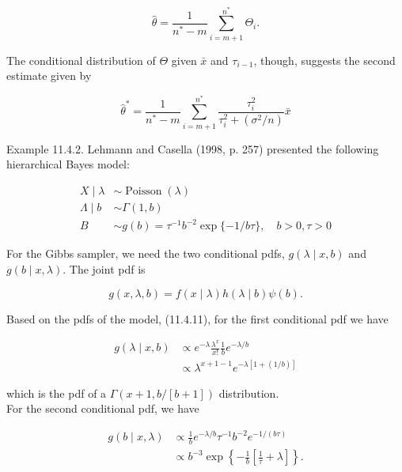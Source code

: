 \begin{equation*}
\widehat{\theta}=\frac{1}{n^{*}-m} \sum_{i=m+1}^{n^{*}} \Theta_{i} . \tag{11.4.9}
\end{equation*}


The conditional distribution of $\Theta$ given $\bar{x}$ and $\tau_{i-1}$, though, suggests the second estimate given by


\begin{equation*}
\widehat{\theta}^{*}=\frac{1}{n^{*}-m} \sum_{i=m+1}^{n^{*}} \frac{\tau_{i}^{2}}{\tau_{i}^{2}+\left(\sigma^{2} / n\right)} \bar{x} \tag{11.4.10}
\end{equation*}


Example 11.4.2. Lehmann and Casella (1998, p. 257) presented the following hierarchical Bayes model:

$$
\begin{aligned}
X \mid \lambda & \sim \operatorname{Poisson}(\lambda) \\
\Lambda \mid b & \sim \Gamma(1, b) \\
B & \sim g(b)=\tau^{-1} b^{-2} \exp \{-1 / b \tau\}, \quad b>0, \tau>0
\end{aligned}
$$

For the Gibbs sampler, we need the two conditional pdfs, $g(\lambda \mid x, b)$ and $g(b \mid x, \lambda)$. The joint pdf is


\begin{equation*}
g(x, \lambda, b)=f(x \mid \lambda) h(\lambda \mid b) \psi(b) . \tag{11.4.11}
\end{equation*}


Based on the pdfs of the model, (11.4.11), for the first conditional pdf we have


\begin{align*}
g(\lambda \mid x, b) & \propto e^{-\lambda} \frac{\lambda^{x}}{x!} \frac{1}{b} e^{-\lambda / b} \\
& \propto \lambda^{x+1-1} e^{-\lambda[1+(1 / b)]} \tag{11.4.12}
\end{align*}


which is the pdf of a $\Gamma(x+1, b /[b+1])$ distribution.\\
For the second conditional pdf, we have

$$
\begin{aligned}
g(b \mid x, \lambda) & \propto \frac{1}{b} e^{-\lambda / b} \tau^{-1} b^{-2} e^{-1 /(b \tau)} \\
& \propto b^{-3} \exp \left\{-\frac{1}{b}\left[\frac{1}{\tau}+\lambda\right]\right\} .
\end{aligned}
$$

